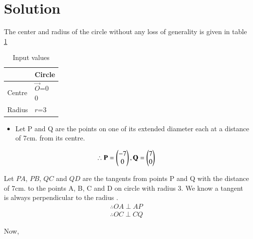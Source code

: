 \documentclass[journal,12pt,twocolumn]{IEEEtran}
\begin{document}
\section{Solution}
The center and radius of the circle without any loss of generality is given in table \ref{tab:table1}
\begin{table}[!ht]
\begin{center}
\begin{tabular}{ | m{2cm} | m{2cm} |} 
\hline
 & Circle \\
\hline
Centre  & $\vec{O}$=\myvec{0\\0} \\ 
\hline
Radius & $r$=3  \\ 
\hline
\end{tabular}
\end{center}
\caption{Input values}
\label{tab:table1}
\end{table}
\begin{itemize}
 \item  Let P and Q are the points on one of its extended diameter each at a distance of 7cm. from its centre.
\end{itemize}
\begin{align}
 \therefore \mathbf{P} = \begin{pmatrix}-7\\0\end{pmatrix},\mathbf{Q} = \begin{pmatrix}7\\0\end{pmatrix}
\end{align}
\begin{lemma}
\label{lemma}
 Let $PA$, $PB$, $QC$ and $QD$  are the tangents from points P and Q with the distance of 7cm. to the points A, B, C and D on circle with radius 3.
 We know a tangent is always perpendicular to the radius .
\begin{align}
\therefore OA \perp AP
\\
\therefore OC \perp CQ
\end{align}
\end{lemma}
Now,
\end{document}
